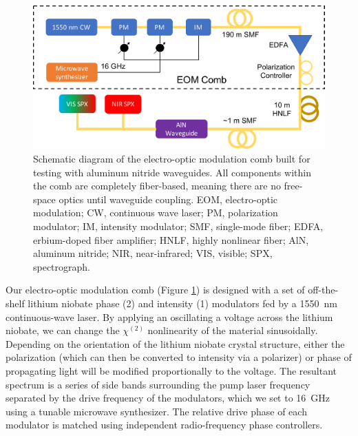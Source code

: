 \begin{figure}
    \centering
    \includegraphics[width=\textwidth]{figures-3/eom-diagram.pdf}
    \caption[Electro-optic modulation comb schematic diagram]{Schematic diagram of the electro-optic modulation comb built for testing with aluminum nitride waveguides. All components within the comb are completely fiber-based, meaning there are no free-space optics until waveguide coupling. EOM, electro-optic modulation; CW, continuous wave laser; PM, polarization modulator; IM, intensity modulator; SMF, single-mode fiber; EDFA, erbium-doped fiber amplifier; HNLF, highly nonlinear fiber; AlN, aluminum nitride; NIR, near-infrared; VIS, visible; SPX, spectrograph.}
    \label{fig:eom-diagram}
\end{figure}

Our electro-optic modulation comb (Figure \ref{fig:eom-diagram}) is designed with a set of off-the-shelf lithium niobate phase (2) and intensity (1) modulators fed by a 1550~\si{\nano\meter} continuous-wave laser. By applying an oscillating a voltage across the lithium niobate, we can change the $\chi^{(2)}$ nonlinearity of the material sinusoidally. Depending on the orientation of the lithium niobate crystal structure, either the polarization (which can then be converted to intensity via a polarizer) or phase of propagating light will be modified proportionally to the voltage. The resultant spectrum is a series of side bands surrounding the pump laser frequency separated by the drive frequency of the modulators, which we set to 16~\si{\giga\hertz} using a tunable microwave synthesizer. The relative drive phase of each modulator is matched using independent radio-frequency phase controllers.

